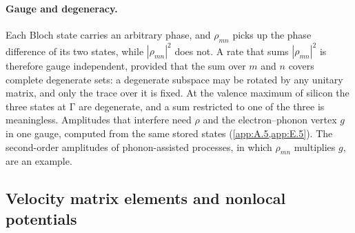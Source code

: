 \paragraph{Gauge and degeneracy.} Each Bloch state carries an arbitrary phase, and $\rho_{mn}$ picks up the phase difference of its two states, while $|\rho_{mn}|^2$ does not. A rate that sums $|\rho_{mn}|^2$ is therefore gauge independent, provided that the sum over $m$ and $n$ covers complete degenerate sets: a degenerate subspace may be rotated by any unitary matrix, and only the trace over it is fixed. At the valence maximum of silicon the three states at $\mathrm{\Gamma}$ are degenerate, and a sum restricted to one of the three is meaningless. Amplitudes that interfere need $\rho$ and the electron--phonon vertex $g$ in one gauge, computed from the same stored states (\cref{app:A.5,app:E.5}). The second-order amplitudes of phonon-assisted processes, in which $\rho_{mn}$ multiplies $g$, are an example.

\subsection{Velocity matrix elements and nonlocal potentials}

